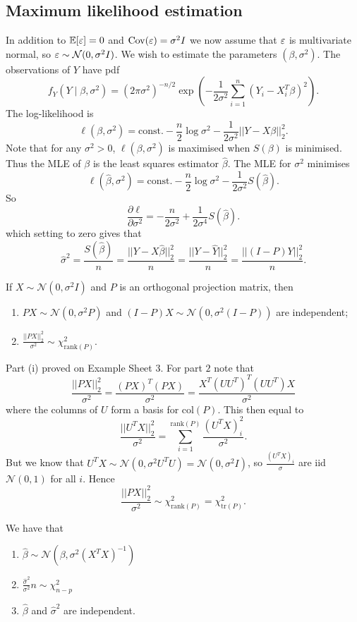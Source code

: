 \documentclass{article}
\begin{document}
\subsection{Maximum likelihood estimation}
In addition to $ \mathbb E[\varepsilon] = 0 $ and $ \mathrm{Cov}(\varepsilon) = \sigma^2 I $ we now assume that $ \varepsilon $ is multivariate normal, so $ \varepsilon \sim \mathcal N(0,\sigma^2 I) $. We wish to estimate the parameters $ (\beta,\sigma^2) $. The observations of $ Y $ have pdf
\[
	f_Y(Y\mid \beta,\sigma^2) = (2\pi \sigma^2)^{-n/2}\exp\left(-\frac 1{2\sigma^2}\sum_{i=1}^n(Y_i-X_i^T\beta)^2\right).
\]
The log-likelihood is
\[
	\ell(\beta,\sigma^2) = \text{const.} - \frac n2 \log\sigma^2 - \frac 1{2\sigma^2}||Y-X\beta||_2^2.
\]
Note that for any $ \sigma^2>0 $, $ \ell(\beta,\sigma^2) $ is maximised when $ S(\beta) $ is minimised. Thus the MLE of $ \beta $ is the least squares estimator $ \hat\beta $. The MLE for $ \sigma^2 $ minimises
\[
	\ell(\hat\beta,\sigma^2) = \text{const.} - \frac n2 \log\sigma^2 - \frac {1}{2\sigma^2}S(\hat\beta).
\]
So
\[
	\frac{\partial \ell}{\partial \sigma^2} = -\frac n{2\sigma^2} + \frac 1{2\sigma^4} S(\hat\beta).
\]
which setting to zero gives that
\[
	\hat\sigma^2 = \frac{S(\hat\beta)}n = \frac{||Y-X\hat\beta||^2_2}n = \frac{||Y-\hat Y||_2^2}n = \frac{||(I-P)Y||_2^2}n.
\]
\begin{theorem}
  If $ X\sim \mathcal N(0,\sigma^2 I) $ and $ P $ is an orthogonal projection matrix, then 
  \begin{enumerate}
	  \item $ PX\sim \mathcal N(0,\sigma^2 P) $ and $ (I-P)X\sim \mathcal N(0,\sigma^2(I-P)) $ are independent;
	  \item $ \frac{||PX||^2_2}{\sigma^2} \sim\chi_{\mathrm{rank}(P)}^2 $.
  \end{enumerate}
\end{theorem}
\pf Part (i) proved on Example Sheet 3. For part $ 2 $ note that
\[
	\frac{||PX||_2^2}{\sigma^2} = \frac{(PX)^T(PX)}{\sigma^2} = \frac{X^T(UU^T)^T(UU^T)X}{\sigma^2}
\]
where the columns of $ U $ form a basis for $ \mathrm{col}(P) $. This then equal to
\[
	\frac{||U^TX||_2^2}{\sigma^2} = \sum_{i=1}^{\mathrm{rank}(P)}\frac{(U^TX)_i^2}{\sigma^2}.
\]
But we know that $ U^TX \sim\mathcal N(0,\sigma^2 U^TU) = \mathcal N(0,\sigma^2 I) $, so $ \frac{(U^TX)_i}{\sigma} $ are iid $ \mathcal N(0,1) $ for all $ i $. Hence
\[
	\frac{||PX||_2^2}{\sigma^2}\sim\chi^2_{\mathrm{rank}(P)} = \chi^2_{\mathrm{tr}(P)}.
\]
\begin{corollary}
  We have that 
  \begin{enumerate}
	  \item $ \hat\beta\sim \mathcal N(\beta,\sigma^2(X^TX)^{-1}) $
	  \item $ \frac{\hat\sigma^2}{\sigma^2}n\sim \chi^2_{n-p} $
	  \item $ \hat\beta $ and $ \hat\sigma^2 $ are independent.
  \end{enumerate}
\end{corollary}
\end{document}
